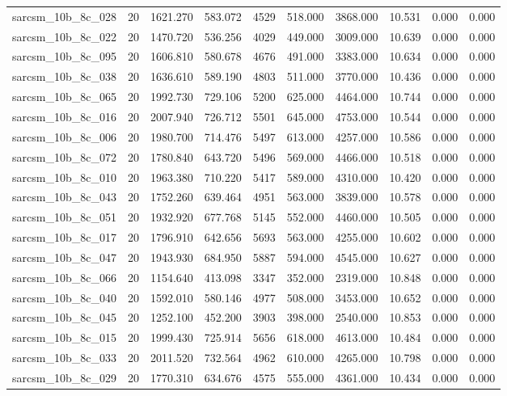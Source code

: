 \begin{tabular}{lrrrrrrrrr}
sarcsm\_10b\_8c\_028 & 20 & 1621.270 & 583.072 & 4529 & 518.000 & 3868.000 & 10.531 & 0.000 & 0.000 \\
sarcsm\_10b\_8c\_022 & 20 & 1470.720 & 536.256 & 4029 & 449.000 & 3009.000 & 10.639 & 0.000 & 0.000 \\
sarcsm\_10b\_8c\_095 & 20 & 1606.810 & 580.678 & 4676 & 491.000 & 3383.000 & 10.634 & 0.000 & 0.000 \\
sarcsm\_10b\_8c\_038 & 20 & 1636.610 & 589.190 & 4803 & 511.000 & 3770.000 & 10.436 & 0.000 & 0.000 \\
sarcsm\_10b\_8c\_065 & 20 & 1992.730 & 729.106 & 5200 & 625.000 & 4464.000 & 10.744 & 0.000 & 0.000 \\
sarcsm\_10b\_8c\_016 & 20 & 2007.940 & 726.712 & 5501 & 645.000 & 4753.000 & 10.544 & 0.000 & 0.000 \\
sarcsm\_10b\_8c\_006 & 20 & 1980.700 & 714.476 & 5497 & 613.000 & 4257.000 & 10.586 & 0.000 & 0.000 \\
sarcsm\_10b\_8c\_072 & 20 & 1780.840 & 643.720 & 5496 & 569.000 & 4466.000 & 10.518 & 0.000 & 0.000 \\
sarcsm\_10b\_8c\_010 & 20 & 1963.380 & 710.220 & 5417 & 589.000 & 4310.000 & 10.420 & 0.000 & 0.000 \\
sarcsm\_10b\_8c\_043 & 20 & 1752.260 & 639.464 & 4951 & 563.000 & 3839.000 & 10.578 & 0.000 & 0.000 \\
sarcsm\_10b\_8c\_051 & 20 & 1932.920 & 677.768 & 5145 & 552.000 & 4460.000 & 10.505 & 0.000 & 0.000 \\
sarcsm\_10b\_8c\_017 & 20 & 1796.910 & 642.656 & 5693 & 563.000 & 4255.000 & 10.602 & 0.000 & 0.000 \\
sarcsm\_10b\_8c\_047 & 20 & 1943.930 & 684.950 & 5887 & 594.000 & 4545.000 & 10.627 & 0.000 & 0.000 \\
sarcsm\_10b\_8c\_066 & 20 & 1154.640 & 413.098 & 3347 & 352.000 & 2319.000 & 10.848 & 0.000 & 0.000 \\
sarcsm\_10b\_8c\_040 & 20 & 1592.010 & 580.146 & 4977 & 508.000 & 3453.000 & 10.652 & 0.000 & 0.000 \\
sarcsm\_10b\_8c\_045 & 20 & 1252.100 & 452.200 & 3903 & 398.000 & 2540.000 & 10.853 & 0.000 & 0.000 \\
sarcsm\_10b\_8c\_015 & 20 & 1999.430 & 725.914 & 5656 & 618.000 & 4613.000 & 10.484 & 0.000 & 0.000 \\
sarcsm\_10b\_8c\_033 & 20 & 2011.520 & 732.564 & 4962 & 610.000 & 4265.000 & 10.798 & 0.000 & 0.000 \\
sarcsm\_10b\_8c\_029 & 20 & 1770.310 & 634.676 & 4575 & 555.000 & 4361.000 & 10.434 & 0.000 & 0.000 \\

\end{tabular}
